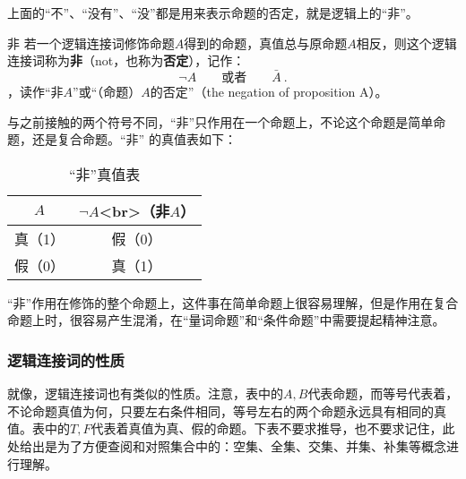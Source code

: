 上面的“不”、“没有”、“没”都是用来表示命题的否定，就是逻辑上的“非”。

\begin{definition}{非}
若一个逻辑连接词修饰命题$A$得到的命题，真值总与原命题$A$相反，则这个逻辑连接词称为\textbf{非}（not，也称为\textbf{否定}），记作：
\begin{equation}
\lnot A\qquad\text{或者}\qquad\bar{A}~.
\end{equation}
，读作“非$A$”或“（命题）$A$的否定”（the negation of proposition A）。
\end{definition}

与之前接触的两个符号不同，“非”只作用在一个命题上，不论这个命题是简单命题，还是复合命题。“非” 的真值表如下：

\begin{table}[ht]
\centering
\caption{“非”真值表}\label{tab_HsCoPr3}
\begin{tabular}{|c|c|}
\hline
$A$ & $\lnot A$<br>（非$A$） \\
\hline
真（1） & 假（0） \\
\hline
假（0） & 真（1） \\
\hline
\end{tabular}
\end{table}

“非”作用在修饰的整个命题上，这件事在简单命题上很容易理解，但是作用在复合命题上时，很容易产生混淆，在“量词命题”和“条件命题”中需要提起精神注意。

\subsubsection{逻辑连接词的性质}

就像，逻辑连接词也有类似的性质。注意，表中的$A,B$代表命题，而等号代表着，不论命题真值为何，只要左右条件相同，等号左右的两个命题永远具有相同的真值。表中的$T,F$代表着真值为真、假的命题。下表不要求推导，也不要求记住，此处给出是为了方便查阅和对照集合中的：空集、全集、交集、并集、补集等概念进行理解。

